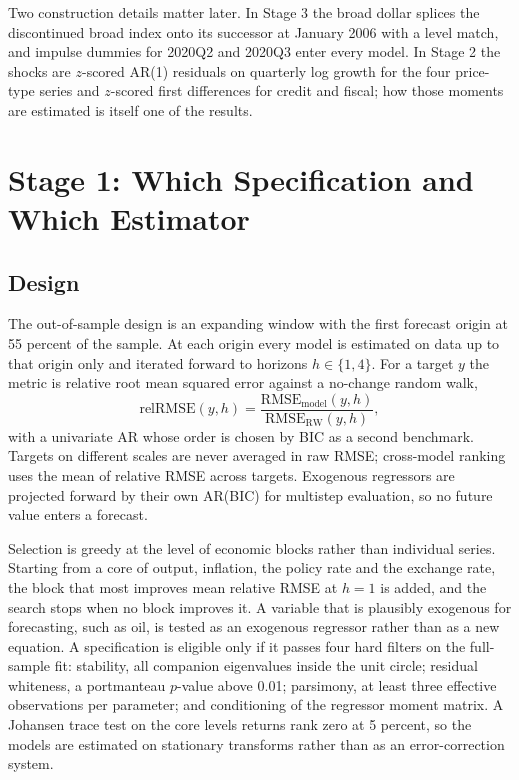 \documentclass[conference]{IEEEtran}
\begin{document}
Two construction details matter later. In Stage 3 the broad dollar splices the discontinued broad index onto its successor at January 2006 with a level match, and impulse dummies for 2020Q2 and 2020Q3 enter every model. In Stage 2 the shocks are $z$-scored AR(1) residuals on quarterly log growth for the four price-type series and $z$-scored first differences for credit and fiscal; how those moments are estimated is itself one of the results.

\section{Stage 1: Which Specification and Which Estimator}

\subsection{Design}
The out-of-sample design is an expanding window with the first forecast origin at 55 percent of the sample. At each origin every model is estimated on data up to that origin only and iterated forward to horizons $h\in\{1,4\}$. For a target $y$ the metric is relative root mean squared error against a no-change random walk,
\begin{equation}
\mathrm{relRMSE}(y,h)=\frac{\mathrm{RMSE}_{\text{model}}(y,h)}{\mathrm{RMSE}_{\text{RW}}(y,h)},
\end{equation}
with a univariate AR whose order is chosen by BIC as a second benchmark. Targets on different scales are never averaged in raw RMSE; cross-model ranking uses the mean of relative RMSE across targets. Exogenous regressors are projected forward by their own AR(BIC) for multistep evaluation, so no future value enters a forecast.

Selection is greedy at the level of economic blocks rather than individual series. Starting from a core of output, inflation, the policy rate and the exchange rate, the block that most improves mean relative RMSE at $h=1$ is added, and the search stops when no block improves it. A variable that is plausibly exogenous for forecasting, such as oil, is tested as an exogenous regressor rather than as a new equation. A specification is eligible only if it passes four hard filters on the full-sample fit: stability, all companion eigenvalues inside the unit circle; residual whiteness, a portmanteau $p$-value above 0.01; parsimony, at least three effective observations per parameter; and conditioning of the regressor moment matrix. A Johansen trace test on the core levels returns rank zero at 5 percent, so the models are estimated on stationary transforms rather than as an error-correction system.
\end{document}
